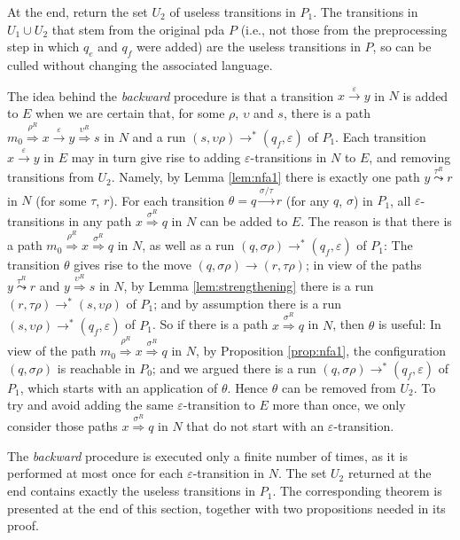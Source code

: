 \documentclass{llncs}
\newcommand{\eps}{\ensuremath{\varepsilon}}
\begin{document}
\vspace{1mm}

\noindent
At the end, return the set $U_2$ of useless transitions in $P_1$. The transitions in $U_1\cup U_2$ that stem from the original pda $P$
(i.e., not those from the preprocessing step in which $q_e$ and $q_f$ were added) are the useless transitions in $P$, so can be culled without
changing the associated language.

The idea behind the {\em backward} procedure is that a transition $x\stackrel{\eps}{\rightarrow}y$ in $N$ is added to $E$ when
we are certain that, for some $\rho$, $\upsilon$ and $s$, there is a path
$m_0\stackrel{\rho^R}{\Rightarrow}x\stackrel{\eps}{\rightarrow}y\stackrel{\upsilon^R}{\Rightarrow}s$ in $N$
and a run $(s,\upsilon\rho)\rightarrow^*(q_f,\eps)$ of $P_1$.
Each transition $x\stackrel{\eps}{\rightarrow}y$ in $E$ may in turn give rise to adding $\eps$-transitions in $N$ to $E$,
and removing transitions from $U_2$. Namely, by Lemma \ref{lem:nfa1} there is exactly one path $y\stackrel{\tau^R}{\leadsto}r$ in $N$ (for some $\tau$, $r$).
For each transition $\theta=q\stackrel{\sigma/\tau}{\rightarrow}r$ (for any $q$, $\sigma$) in $P_1$,
all $\eps$-transitions in any path $x\stackrel{\sigma^R}{\Rightarrow}q$ in $N$
can be added to $E$. The reason is that there is a path $m_0\stackrel{\rho^R}{\Rightarrow}x\stackrel{\sigma^R}{\Rightarrow}q$ in $N$,
as well as a run $(q,\sigma\rho)\rightarrow^*(q_f,\eps)$ of $P_1$: The transition $\theta$ gives rise to the move $(q,\sigma\rho)\rightarrow(r,\tau\rho)$;
in view of the paths $y\stackrel{\tau^R}{\leadsto}r$ and $y\stackrel{\upsilon^R}{\Rightarrow}s$ in $N$,
by Lemma \ref{lem:strengthening} there is a run $(r,\tau\rho)\rightarrow^*(s,\upsilon\rho)$ of $P_1$; and
by assumption there is a run $(s,\upsilon\rho)\rightarrow^*(q_f,\eps)$ of $P_1$. So if there is a path $x\stackrel{\sigma^R}{\Rightarrow}q$ in $N$,
then $\theta$ is useful: In view of the path $m_0\stackrel{\rho^R}{\Rightarrow}x\stackrel{\sigma^R}{\Rightarrow}q$ in $N$, by Proposition \ref{prop:nfa1},
the configuration $(q,\sigma\rho)$ is reachable in $P_0$; and we argued there is a run $(q,\sigma\rho)\rightarrow^*(q_f,\eps)$ of $P_1$,
which starts with an application of $\theta$. Hence $\theta$ can be removed from $U_2$.
To try and avoid adding the same $\eps$-transition to $E$ more than once,
we only consider those paths $x\stackrel{\sigma^R}{\Rightarrow}q$ in $N$ that do not start with an $\eps$-transition.

The {\em backward} procedure is executed only a finite number of times, as it is performed at most once for each $\eps$-transition in $N$.
The set $U_2$ returned at the end contains exactly the useless transitions in $P_1$.
The corresponding theorem is presented at the end of this section, together with two propositions needed in its proof.
\end{document}
